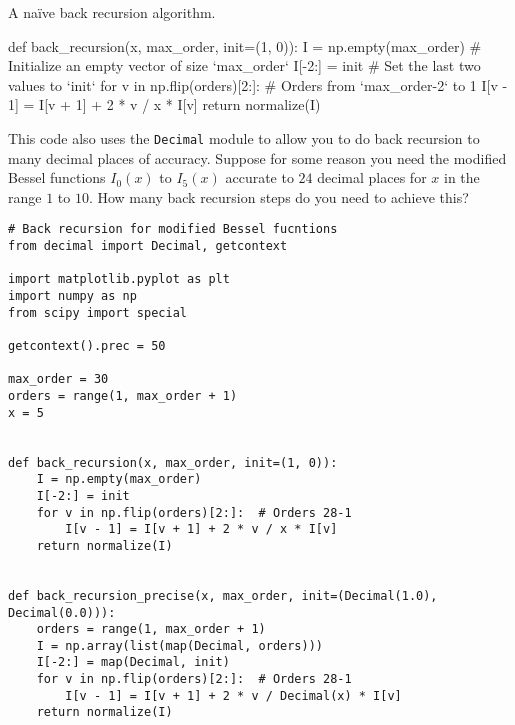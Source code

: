 \begin{algorithm}
    \caption{A naïve back recursion algorithm.}
    \label{lst:back_recursion}
    \begin{pythoncode}
        def back_recursion(x, max_order, init=(1, 0)):
            I = np.empty(max_order)  # Initialize an empty vector of size `max_order`
            I[-2:] = init  # Set the last two values to `init`
            for v in np.flip(orders)[2:]:  # Orders from `max_order-2` to 1
                I[v - 1] = I[v + 1] + 2 * v / x * I[v]
            return normalize(I)
    \end{pythoncode}
\end{algorithm}

\Question This code also uses the \texttt{Decimal} module to allow you to do back recursion to many
decimal places of accuracy. Suppose for some reason you need the modified Bessel functions
$I_0(x)$ to $I_5(x)$ accurate to $24$ decimal places for $x$ in the range $1$ to $10$. How
many back recursion steps do you need to achieve this?

\begin{verbatim}
# Back recursion for modified Bessel fucntions
from decimal import Decimal, getcontext

import matplotlib.pyplot as plt
import numpy as np
from scipy import special

getcontext().prec = 50

max_order = 30
orders = range(1, max_order + 1)
x = 5


def back_recursion(x, max_order, init=(1, 0)):
    I = np.empty(max_order)
    I[-2:] = init
    for v in np.flip(orders)[2:]:  # Orders 28-1
        I[v - 1] = I[v + 1] + 2 * v / x * I[v]
    return normalize(I)


def back_recursion_precise(x, max_order, init=(Decimal(1.0), Decimal(0.0))):
    orders = range(1, max_order + 1)
    I = np.array(list(map(Decimal, orders)))
    I[-2:] = map(Decimal, init)
    for v in np.flip(orders)[2:]:  # Orders 28-1
        I[v - 1] = I[v + 1] + 2 * v / Decimal(x) * I[v]
    return normalize(I)
\end{verbatim}
